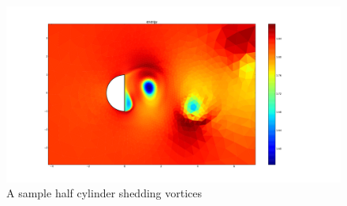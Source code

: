 \documentclass[12pt,parskip=full]{article}
\numberwithin{subsection}{section}
\begin{document}
		\begin{figure}[H]
			\centering
			\includegraphics[width=\textwidth,trim={7cm 2cm 10cm 2cm},clip]{HalfCylinderVortex.pdf}
			\caption{A sample half cylinder shedding vortices}
		\end{figure}

		
		
\end{document}

